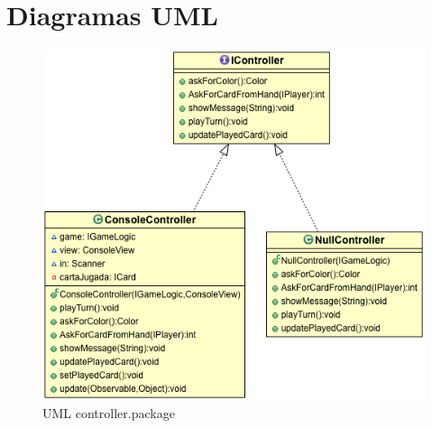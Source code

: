 \documentclass[letterpaper,11pt]{article}
\begin{document}
\lstset{language=Java} 


	\oddsidemargin 0cm \topmargin -2cm \textheight 21cm \textwidth
	16.5cm \headheight 1cm \linespread {1.0} \headsep 1cm \parindent 0mm

	












\center
\section{Diagramas UML}


\begin{figure}[H]
\center
\includegraphics[scale=0.5]{controller.png}
\caption{UML controller.package}
\end{figure}
\end{document}
